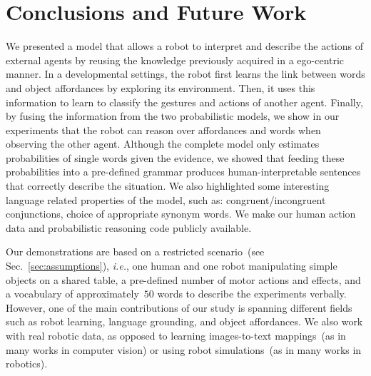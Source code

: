 
\section{Conclusions and Future Work}
\label{sec:conclusions}

We presented a model that allows a robot to interpret and describe the actions of external agents by reusing the knowledge previously acquired in a ego-centric manner.
In a developmental settings, the robot first learns the link between words and object affordances by exploring its environment.
Then, it uses this information to learn to classify the gestures and actions of another agent.
Finally, by fusing the information from the two probabilistic models, we show in our experiments that the robot can reason over affordances and words when observing the other agent.
Although the complete model only estimates probabilities of single words given the evidence, we showed that feeding these probabilities into a pre-defined grammar produces human-interpretable sentences that correctly describe the situation.
We also highlighted some interesting language related properties of the model, such as:
congruent/incongruent conjunctions,
choice of appropriate synonym words. %
We make our human action data and probabilistic reasoning code publicly available.

Our demonstrations are based on a restricted scenario~(see Sec.~\ref{sec:assumptions}), \textit{i.e.}, one human and one robot manipulating simple objects on a shared table, a pre-defined number of motor actions and effects, and a vocabulary of approximately~$50$ words to describe the experiments verbally.
However, one of the main contributions of our study is spanning different fields such as robot learning, language grounding, and object affordances.
We also work with real robotic data, as opposed to learning images-to-text mappings~(as in many works in computer vision) or using robot simulations~(as in many works in robotics).

